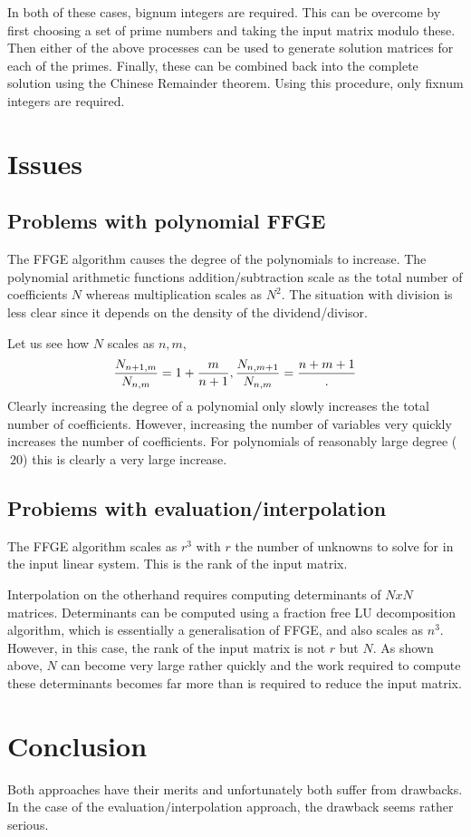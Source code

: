 \documentclass{article}
\begin{document}
In both of these cases, bignum integers are required. This can be overcome by first choosing a set of prime numbers and taking
the input matrix modulo these. Then either of the above processes can be used to generate solution matrices for each of the primes.
Finally, these can be combined back into the complete solution using the Chinese Remainder theorem. Using this procedure, only
fixnum integers are required.


\section{Issues}

\subsection{Problems with polynomial FFGE}
The FFGE algorithm causes the degree of the polynomials to increase. The polynomial arithmetic
functions addition/subtraction scale as the total number of coefficients $N$ whereas multiplication
scales as $N^2$. The situation with division is less clear since it depends on the density of the dividend/divisor.

Let us see how $N$ scales as $n, m$,
\begin{equation}
  \frac{N_{n+1,m}}{N_{n,m}} = 1 + \frac{m}{n + 1}, \\
  \frac{N_{n,m+1}}{N_{n,m}} = \frac{n + m + 1}.
\end{equation}
Clearly increasing the degree of a polynomial only slowly increases the total number of coefficients. However,
increasing the number of variables very quickly increases the number of coefficients. For polynomials of reasonably
large degree ($~20$) this is clearly a very large increase.

\subsection{Probiems with evaluation/interpolation}
The FFGE algorithm scales as $r^3$ with $r$ the number of unknowns to solve for in the input linear system. This
is the rank of the input matrix.

Interpolation on the otherhand requires computing determinants of $N x N$ matrices. Determinants can be computed using
a fraction free LU decomposition algorithm, which is essentially a generalisation of FFGE, and also scales as $n^3$. However,
in this case, the rank of the input matrix is not $r$ but $N$. As shown above, $N$ can become very large rather quickly
and the work required to compute these determinants becomes far more than is required to reduce the input matrix.

\section{Conclusion}
Both approaches have their merits and unfortunately both suffer from drawbacks. In the case of the evaluation/interpolation
approach, the drawback seems rather serious. 
\end{document}
